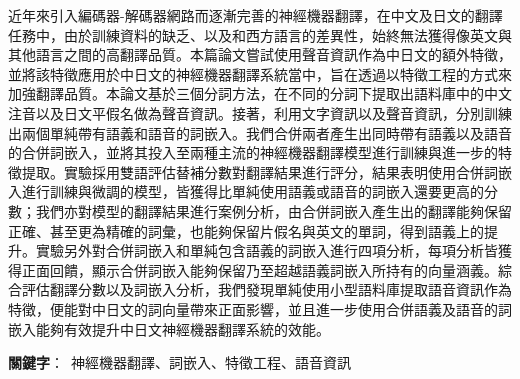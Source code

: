 近年來引入編碼器-解碼器網路而逐漸完善的神經機器翻譯，在中文及日文的翻譯任務中，由於訓練資料的缺乏、以及和西方語言的差異性，始終無法獲得像英文與其他語言之間的高翻譯品質。本篇論文嘗試使用聲音資訊作為中日文的額外特徵，並將該特徵應用於中日文的神經機器翻譯系統當中，旨在透過以特徵工程的方式來加強翻譯品質。本論文基於三個分詞方法，在不同的分詞下提取出語料庫中的中文注音以及日文平假名做為聲音資訊。接著，利用文字資訊以及聲音資訊，分別訓練出兩個單純帶有語義和語音的詞嵌入。我們合併兩者產生出同時帶有語義以及語音的合併詞嵌入，並將其投入至兩種主流的神經機器翻譯模型進行訓練與進一步的特徵提取。實驗採用雙語評估替補分數對翻譯結果進行評分，結果表明使用合併詞嵌入進行訓練與微調的模型，皆獲得比單純使用語義或語音的詞嵌入還要更高的分數；我們亦對模型的翻譯結果進行案例分析，由合併詞嵌入產生出的翻譯能夠保留正確、甚至更為精確的詞彙，也能夠保留片假名與英文的單詞，得到語義上的提升。實驗另外對合併詞嵌入和單純包含語義的詞嵌入進行四項分析，每項分析皆獲得正面回饋，顯示合併詞嵌入能夠保留乃至超越語義詞嵌入所持有的向量涵義。綜合評估翻譯分數以及詞嵌入分析，我們發現單純使用小型語料庫提取語音資訊作為特徵，便能對中日文的詞向量帶來正面影響，並且進一步使用合併語義及語音的詞嵌入能夠有效提升中日文神經機器翻譯系統的效能。

\begin{flushleft}
\mbox{{\bf 關鍵字}： 神經機器翻譯、詞嵌入、特徵工程、語音資訊}
\end{flushleft}